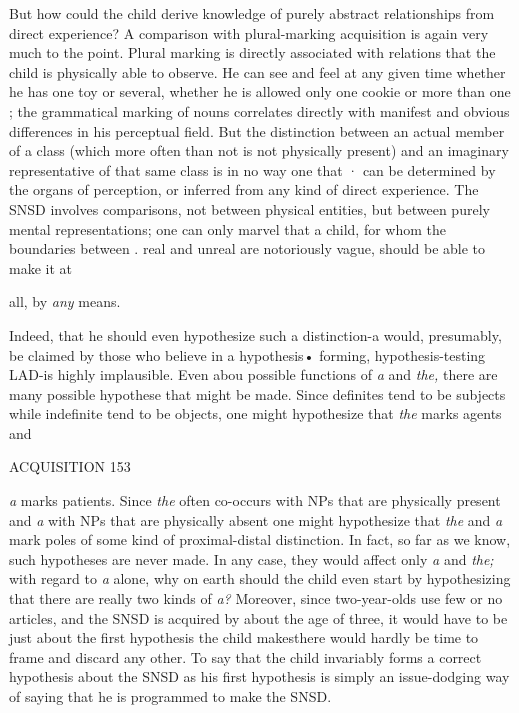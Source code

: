 But how could the child derive knowledge of purely abstract relationships from direct experience? A comparison with plural-marking acquisition is again very much to the point. Plural marking is directly associated with relations that the child is physically able to observe. He can see and feel at any given time whether he has one toy or several, whether he is allowed only one cookie or more than one ; the gramma\-tical marking of nouns correlates directly with manifest and obvious differences in his perceptual field. But the distinction between an actual member of a class (which more often than not is not physically present) and an imaginary representative of that same class is in no way one that · can be determined by the organs of perception, or inferred from any kind of direct experience. The SNSD involves comparisons, not between physical entities, but between purely mental representations; one can only marvel that a child, for whom the boundaries between . real and unreal are notoriously vague, should be able to make it at

all, by \textit{any} means.

Indeed, that he should even hypothesize such a distinction-a would, presumably, be claimed by those who believe in a hypothesis• forming, hypothesis-testing LAD-is highly implausible. Even abou possible functions of \textit{a} and \textit{the,} there are many possible hypothese that might be made. Since definites tend to be subjects while indefinite tend to be objects, one might hypothesize that \textit{the} marks agents and

ACQUISITION 153

\textit{a} marks patients. Since \textit{the} often co-occurs with NPs that are physically present and \textit{a} with NPs that are physically absent one might hy\-pothesize that \textit{the }and \textit{a} mark poles of some kind of proximal-distal distinction. In fact, so far as we know, such hypotheses are never made. In any case, they would affect only \textit{a} and \textit{the; }with regard to \textit{a} alone, why on earth should the child even start by hypothesizing that there are really two kinds of \textit{a? }Moreover, since two-year-olds use few or no articles, and the SNSD is acquired by about the age of three, it would have to be just about the first hypothesis the child makes\-there would hardly be time to frame and discard any other. To say that the child invariably forms a correct hypothesis about the SNSD as his first hypothesis is simply an issue-dodging way of saying that he is programmed to make the SNSD.


